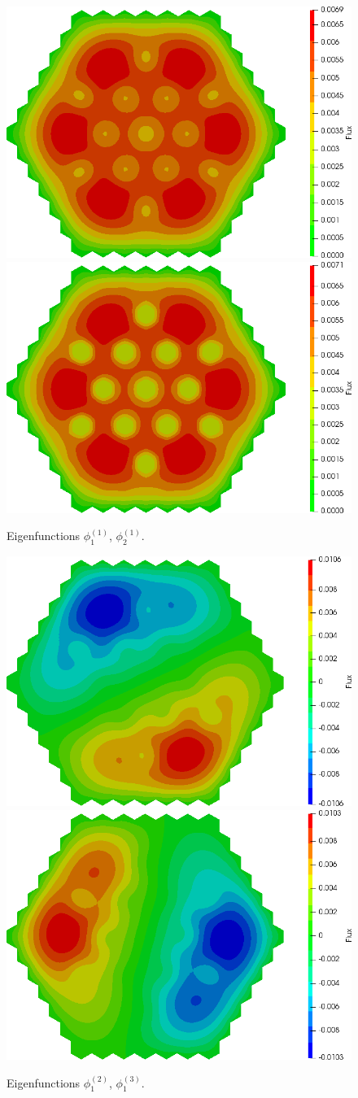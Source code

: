 \documentclass[authoryear]{elsarticle}
\begin{document}
\begin{figure}[htp]
\begin{center}
	\includegraphics[width=0.49\linewidth]{iaea_without/alpha_delayed_sp3_u1_1_without.png}
	\includegraphics[width=0.49\linewidth]{iaea_without/alpha_delayed_sp3_u2_1_without.png}\\
	\caption{Eigenfunctions $\phi_1^{(1)}$, $\phi_2^{(1)}$.}
	\label{fig:iaea_without_fun_del_1}
\end{center}
\end{figure}
\begin{figure}[htp]
\begin{center}
	\includegraphics[width=0.49\linewidth]{iaea_without/alpha_delayed_sp3_u1_2_without.png}
	\includegraphics[width=0.49\linewidth]{iaea_without/alpha_delayed_sp3_u1_3_without.png}\\
	\caption{Eigenfunctions $\phi_1^{(2)}$, $\phi_1^{(3)}$.}
	\label{fig:iaea_without_fun_del_2}
\end{center}
\end{figure}
\end{document}
